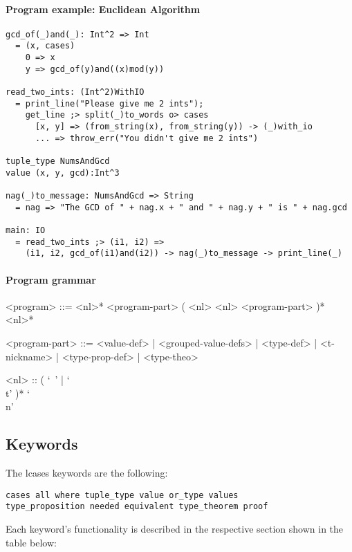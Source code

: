 \documentclass{article}
\begin{document}
\paragraph{Program example: Euclidean Algorithm}
\begin{verbatim}
gcd_of(_)and(_): Int^2 => Int
  = (x, cases)
    0 => x
    y => gcd_of(y)and((x)mod(y))

read_two_ints: (Int^2)WithIO
  = print_line("Please give me 2 ints");
    get_line ;> split(_)to_words o> cases
      [x, y] => (from_string(x), from_string(y)) -> (_)with_io
      ... => throw_err("You didn't give me 2 ints")

tuple_type NumsAndGcd
value (x, y, gcd):Int^3

nag(_)to_message: NumsAndGcd => String
  = nag => "The GCD of " + nag.x + " and " + nag.y + " is " + nag.gcd

main: IO
  = read_two_ints ;> (i1, i2) =>
    (i1, i2, gcd_of(i1)and(i2)) -> nag(_)to_message -> print_line(_)
\end{verbatim}

\paragraph{Program grammar}
\begin{grammar}
<program> ::=
<nl>* <program-part> ( <nl> <nl> <program-part> )* <nl>*

<program-part> ::=
<value-def> | <grouped-value-defs> | <type-def> | <t-nickname> |
<type-prop-def> | <type-theo>

<nl> :: ( `\ ' | `\\t' )* `\\n'
\end{grammar}

\newpage
\subsection{Keywords}

The lcases keywords are the following:
\begin{verbatim}
cases all where tuple_type value or_type values
type_proposition needed equivalent type_theorem proof
\end{verbatim}
Each keyword's functionality is described in the respective section shown in
the table below:
\end{document}
